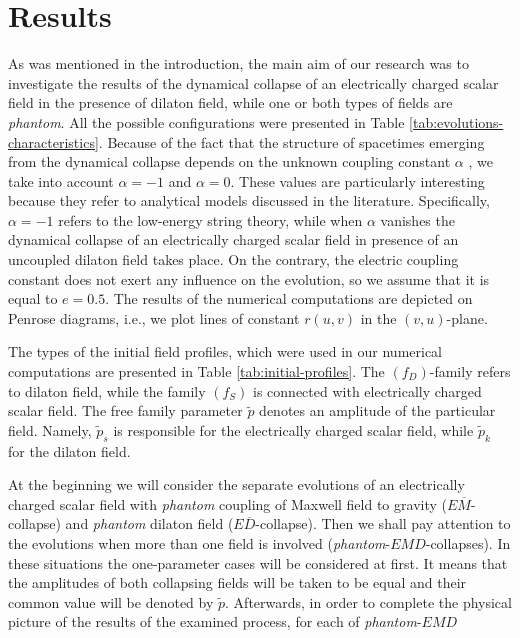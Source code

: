 \documentclass[aps,showpacs,nofootinbib,floatfix]{revtex4}
\newcommand{\tpe}{{\tilde p}}
\begin{document}
\section{Results}
As was mentioned in the introduction, the main aim of our research was to investigate the results of 
the dynamical collapse of an electrically charged scalar field in the presence of dilaton field, while one or 
both types of fields are {\it phantom}. All the possible configurations were presented in 
Table \ref{tab:evolutions-characteristics}. 
Because of the fact that the structure of spacetimes emerging from the dynamical collapse depends on the 
unknown coupling constant $\alpha$ \cite{bor11}, we take into account $\alpha = -1$ and $\alpha = 0$. 
These values are particularly interesting because they refer to analytical models discussed in the literature. 
Specifically, $\alpha=-1$ refers to the low-energy string theory, while when $\alpha$ vanishes the dynamical collapse
of an electrically charged scalar field in presence of an uncoupled dilaton field takes place.
On the contrary, the electric coupling constant
does not exert any influence on the evolution, so we assume that it is equal to $e=0.5$.
The results of the numerical computations are depicted on Penrose diagrams, i.e., we plot lines of constant  
$r\left(u,v\right)$ in the $\left(v,u\right)$-plane.               
\par
The types of the initial field profiles, which were used in our numerical computations are presented in 
Table \ref{tab:initial-profiles}. The $\left(f_D\right)$-family refers to dilaton field, while 
the family $\left(f_S\right)$ is connected with electrically charged scalar field. The free family 
parameter $\tpe$ denotes an amplitude of the particular field. 
Namely, $\tpe_s$ is responsible for the electrically charged scalar field, while $\tpe_k$ for the dilaton field.
\par
At the beginning we will consider the separate evolutions of an electrically charged scalar field with {\it phantom} coupling of Maxwell field to gravity ($E\overline{M}$-collapse) and {\it phantom} dilaton field ($E\overline{D}$-collapse). 
Then we shall pay attention to the evolutions when more than one field is involved ({\it phantom}-$EMD$-collapses). In these situations the one-parameter cases will be considered at first. It means that the amplitudes of both collapsing fields will be taken to be equal and their common value will be denoted by $\tpe$. Afterwards, in order to complete the physical picture of the results of the examined process, for each of {\it phantom}-$EMD$ 
\end{document}
